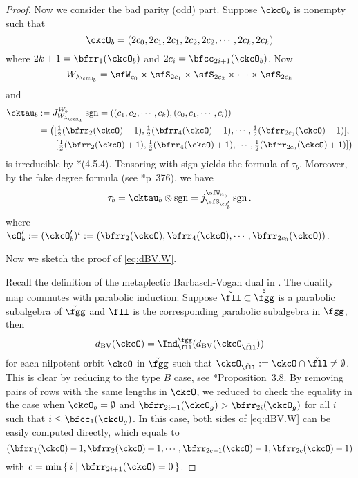 \documentclass[12pt,a4paper]{amsart}
\newcommand{\sgn}{\operatorname{sgn}}
\numberwithin{equation}{section}
\theoremstyle{remark}
\def\half{{\tfrac{1}{2}}}
\def\dBV{d_{\mathrm{BV}}}
\def\lamckb{\lambda_{\ckcO_b}}
\def\ckfgg{{\check \fgg}}
\begin{document}
\begin{proof}
    Now we consider the bad parity (odd) part. Suppose $\ckcO_{b}$ is nonempty
    such that
    \[
      \ckcO_{b} = (2c_{0},2c_{1}, 2c_{1}, 2c_{2},2c_{2}, \cdots, 2c_{k}, 2c_{k})
    \]
    where $2k+1=\bfrr_{1}(\ckcO_{b})$ and $2c_{i} = \bfcc_{2i+1}(\ckcO_{b})$.
    Now
    \[
      W_{\lamckb} = \sfW_{c_{0}} \times \sfS_{2c_{1}} \times \sfS_{2c_{2}}\times \cdots \times \sfS_{2c_{k}}
    \]
    and %
    \[
      \begin{split}
        \cktau_{b} &:= J_{W_{\lamckb}}^{W_{b}} \sgn
        = ((c_{1},c_{2},\cdots, c_{k}),(c_{0},c_{1}, \cdots, c_{l}))\\
        & = \big([\half(\bfrr_{2}(\ckcO)-1),\half(\bfrr_{4}(\ckcO)-1),\cdots, \half(\bfrr_{2c_{0}}(\ckcO)-1)],\\
        & \hspace{2em} [\half(\bfrr_{2}(\ckcO)+1),\half(\bfrr_{4}(\ckcO)+1),\cdots, \half(\bfrr_{2c_{0}}(\ckcO)+1)]\big)
      \end{split}
    \]
    is irreducible by \cite{Lu}*{(4.5.4)}. Tensoring with sign yields the
    formula of $\tau_{b}$. Moreover, by the fake degree formula (see
    \cite{Carter}*{p~376}), we have
    \[
      \tau_{b} = \cktau_{b}\otimes \sgn = j_{\sfS_{\cO'_{b}}}^{\sfW_{n_{b}}} \sgn.
    \]
    where
    $ \cO'_{b} := (\ckcO'_{b})^{t}:=(\bfrr_{2}(\ckcO),\bfrr_{4}(\ckcO),\cdots , \bfrr_{2c_{0}}(\ckcO))$.

    \medskip \def\ckfll{\check{\fll}}

    Now we sketch the proof of \eqref{eq:dBV.W}.

    Recall the definition of the metaplectic Barbasch-Vogan dual in
    \cite{BMSZ1}. The duality map commutes with parabolic induction: Suppose
    $\ckfll\subset \check \ckfgg$ is a parabolic subalgebra of $\ckfgg$ and
    $\fll$ is the corresponding parabolic subalgebra in $\fgg$, then
    \begin{equation}\label{eq:inddBV}
      \dBV(\ckcO) =  \Ind_{\fll}^{\fgg}(\dBV(\ckcO_{\ckfll}))
    \end{equation}
    for each nilpotent orbit $\ckcO$ in $\ckfgg$ such that
    $\ckcO_{\ckfll}:=\ckcO\cap \ckfll\neq \emptyset$. This is clear by reducing
    to the type $B$ case, see \cite{BMSZ1}*{Proposition~3.8}. By removing pairs
    of rows with the same lengths in $\ckcO$, we reduced to check the equality
    in the case when $\ckcO_{b}=\emptyset$ and
    $\bfrr_{2i-1}(\ckcO_{g})>\bfrr_{2i}(\ckcO_{g})$ for all $i$ such that
    $i\leq \bfcc_{1}(\ckcO_{g})$. In this case, both sides of \eqref{eq:dBV.W}
    can be easily computed directly, which equals to
    \[
      (\bfrr_{1}(\ckcO)-1, \bfrr_{2}(\ckcO)+1, \cdots,\bfrr_{2c-1}(\ckcO)-1,\bfrr_{2c}(\ckcO)+1)
    \]
    with $c = \min\set{i|\bfrr_{2i+1}(\ckcO)=0}$.


\end{proof}
\end{document}
